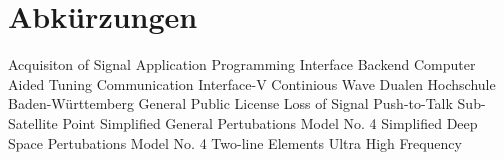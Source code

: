 
\chapter*{Abkürzungen}

\begin{acronym}[NORAD1]	%
		{Acquisiton of Signal}	
		{Application Programming Interface}	
		{Backend}
		{Computer Aided Tuning}
		{Communication Interface-V}
		{Continious Wave}	
	 {Dualen Hochschule Baden-Württemberg}
		{General Public License}		
		{Loss of Signal}
		{Push-to-Talk}	
		{Sub-Satellite Point}
		{Simplified General Pertubations Model No. 4}
		{Simplified Deep Space Pertubations Model No. 4}
		{Two-line Elements}	
		{Ultra High Frequency}
\end{acronym}
\clearpage
